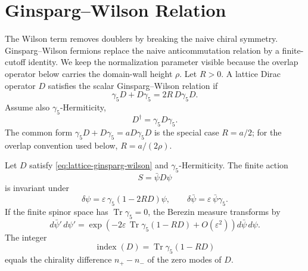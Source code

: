 \section{Ginsparg--Wilson Relation}

The Wilson term removes doublers by breaking the naive chiral symmetry.
Ginsparg--Wilson fermions replace the naive anticommutation relation by a
finite-cutoff identity.  We keep the normalization parameter visible because
the overlap operator below carries the domain-wall height \(\rho\).  Let
\(R>0\).  A lattice Dirac operator \(D\) satisfies the scalar
Ginsparg--Wilson relation if
\begin{equation}
  \gamma_5D+D\gamma_5=2R\,D\gamma_5D .
  \label{eq:lattice-ginsparg-wilson}
\end{equation}
Assume also \(\gamma_5\)-Hermiticity,
\[
  D^\dagger=\gamma_5D\gamma_5 .
\]
The common form \(\gamma_5D+D\gamma_5=aD\gamma_5D\) is the special case
\(R=a/2\); for the overlap convention used below, \(R=a/(2\rho)\).

\begin{lemma}
\label{lem:lattice-gw-chiral-jacobian}
Let \(D\) satisfy \eqref{eq:lattice-ginsparg-wilson} and
\(\gamma_5\)-Hermiticity.  The finite action
\[
  S=\bar\psi D\psi
\]
is invariant under
\[
  \delta\psi=\varepsilon\,\gamma_5(1-2RD)\psi,
  \qquad
  \delta\bar\psi=\varepsilon\,\bar\psi\gamma_5 .
\]
If the finite spinor space has \(\operatorname{Tr}\gamma_5=0\), the Berezin
measure transforms by
\[
  d\bar\psi'\,d\psi'
  =
  \exp\!\left(
    -2\varepsilon\,
    \operatorname{Tr}\gamma_5(1-RD)
    +O(\varepsilon^2)
  \right)
  d\bar\psi\,d\psi .
\]
The integer
\begin{equation}
  \operatorname{index}(D)
  =
  \operatorname{Tr}\gamma_5(1-RD)
  \label{eq:lattice-gw-index}
\end{equation}
equals the chirality difference \(n_+-n_-\) of the zero modes of \(D\).
\end{lemma}

